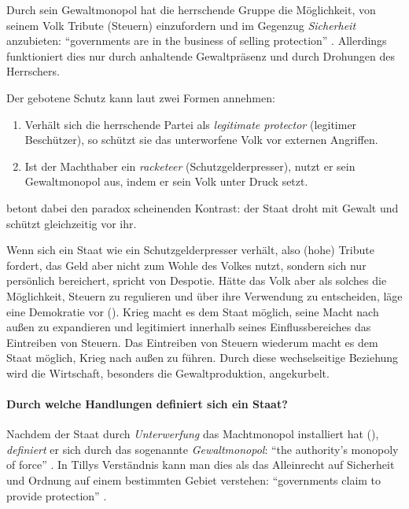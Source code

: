 Durch sein Gewaltmonopol hat die herrschende Gruppe die Möglichkeit, von seinem Volk Tribute (Steuern) einzufordern und im Gegenzug \emph{Sicherheit} anzubieten: ``governments are in the business of selling protection'' \parencite[175]{Tilly-1985-aa}.
Allerdings funktioniert dies nur durch anhaltende Gewaltpräsenz und durch Drohungen des Herrschers.

Der gebotene Schutz kann laut \citeauthor{Tilly-1985-aa} zwei Formen annehmen:

\begin{enumerate}
	\item Verhält sich die herrschende Partei als \emph{legitimate protector} (legitimer Beschützer), so schützt sie das unterworfene Volk vor externen Angriffen.

	\item Ist der Machthaber ein \emph{racketeer} (Schutzgelderpresser), nutzt er sein Gewaltmonopol aus, indem er sein Volk unter Druck setzt.
\end{enumerate}

\citeauthor{Tilly-1985-aa} betont dabei den paradox scheinenden Kontrast: der Staat droht mit Gewalt und schützt gleichzeitig vor ihr.

Wenn sich ein Staat wie ein Schutzgelderpresser verhält, also (hohe) Tribute fordert, das Geld aber nicht zum Wohle des Volkes nutzt, sondern sich nur persönlich bereichert, spricht \citeauthor{Tilly-1985-aa} von Despotie.
Hätte das Volk aber als solches die Möglichkeit, Steuern zu regulieren und über ihre Verwendung zu entscheiden, läge eine Demokratie vor (\parencite[vgl.][176]{Tilly-1985-aa}).
Krieg macht es dem Staat möglich, seine Macht nach außen zu expandieren und legitimiert innerhalb seines Einflussbereiches das Eintreiben von Steuern.
Das Eintreiben von Steuern  wiederum macht es dem Staat möglich, Krieg nach außen zu führen.
Durch diese wechselseitige Beziehung wird die Wirtschaft, besonders die Gewaltproduktion, angekurbelt.


\paragraph{Durch welche Handlungen definiert sich ein Staat?}

Nachdem der Staat durch \emph{Unterwerfung} das Machtmonopol installiert hat (\parencite[vgl.][175]{Tilly-1985-aa}), \emph{definiert} er sich durch das sogenannte \emph{Gewaltmonopol}: ``the authority's monopoly of force'' \parencite[vgl.][172]{Tilly-1985-aa}.
In Tillys Verständnis kann man dies als das Alleinrecht auf Sicherheit und Ordnung auf einem bestimmten Gebiet verstehen: ``governments claim to provide protection'' \parencite[vgl.][172]{Tilly-1985-aa}.

